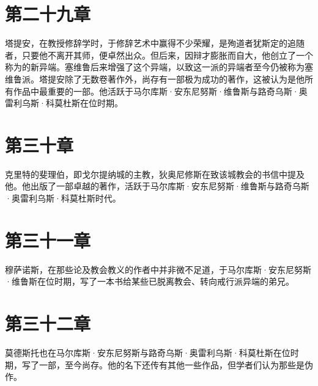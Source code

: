 
\section{第二十九章}

塔提安，在教授修辞学时，于修辞艺术中赢得不少荣耀，是殉道者犹斯定的追随者，只要他不离开其师，便卓然出众。但后来，因辩才膨胀而自大，他创立了一个称为的新异端。塞维鲁后来增强了这个异端，以致这一派的异端者至今仍被称为塞维鲁派。塔提安除了无数卷著作外，尚存有一部极为成功的著作，这被认为是他所有作品中最重要的一部。他活跃于马尔库斯·安东尼努斯·维鲁斯与路奇乌斯·奥雷利乌斯·科莫杜斯在位时期。\newline{}\par


\section{第三十章}

克里特的斐理伯，即戈尔提纳城的主教，狄奥尼修斯在致该城教会的书信中提及他。他出版了一部卓越的著作，活跃于马尔库斯·安东尼努斯·维鲁斯与路奇乌斯·奥雷利乌斯·科莫杜斯时代。\newline{}\par


\section{第三十一章}

穆萨诺斯，在那些论及教会教义的作者中并非微不足道，于马尔库斯·安东尼努斯·维鲁斯在位时期，写了一本书给某些已脱离教会、转向戒行派异端的弟兄。\newline{}\par


\section{第三十二章}

莫德斯托也在马尔库斯·安东尼努斯与路奇乌斯·奥雷利乌斯·科莫杜斯在位时期，写了一部，至今尚存。他的名下还传有其他一些作品，但学者们认为那些是伪作。\newline{}\par

